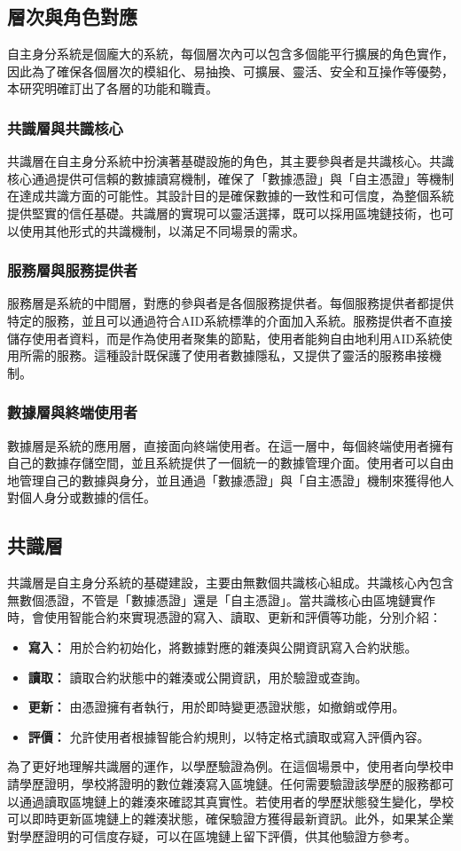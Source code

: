 \subsection{層次與角色對應}
自主身分系統是個龐大的系統，每個層次內可以包含多個能平行擴展的角色實作，因此為了確保各個層次的模組化、易抽換、可擴展、靈活、安全和互操作等優勢，本研究明確訂出了各層的功能和職責。
\subsubsection{共識層與共識核心}
共識層在自主身分系統中扮演著基礎設施的角色，其主要參與者是共識核心。共識核心通過提供可信賴的數據讀寫機制，確保了「數據憑證」與「自主憑證」等機制在達成共識方面的可能性。其設計目的是確保數據的一致性和可信度，為整個系統提供堅實的信任基礎。共識層的實現可以靈活選擇，既可以採用區塊鏈技術，也可以使用其他形式的共識機制，以滿足不同場景的需求。
\subsubsection{服務層與服務提供者}
服務層是系統的中間層，對應的參與者是各個服務提供者。每個服務提供者都提供特定的服務，並且可以通過符合AID系統標準的介面加入系統。服務提供者不直接儲存使用者資料，而是作為使用者聚集的節點，使用者能夠自由地利用AID系統使用所需的服務。這種設計既保護了使用者數據隱私，又提供了靈活的服務串接機制。
\subsubsection{數據層與終端使用者}
數據層是系統的應用層，直接面向終端使用者。在這一層中，每個終端使用者擁有自己的數據存儲空間，並且系統提供了一個統一的數據管理介面。使用者可以自由地管理自己的數據與身分，並且通過「數據憑證」與「自主憑證」機制來獲得他人對個人身分或數據的信任。
\subsection{共識層}
共識層是自主身分系統的基礎建設，主要由無數個共識核心組成。共識核心內包含無數個憑證，不管是「數據憑證」還是「自主憑證」。當共識核心由區塊鏈實作時，會使用智能合約來實現憑證的寫入、讀取、更新和評價等功能，分別介紹：
\begin{itemize}
  \item \textbf{寫入：} 用於合約初始化，將數據對應的雜湊與公開資訊寫入合約狀態。
  \item \textbf{讀取：} 讀取合約狀態中的雜湊或公開資訊，用於驗證或查詢。
  \item \textbf{更新：} 由憑證擁有者執行，用於即時變更憑證狀態，如撤銷或停用。
  \item \textbf{評價：} 允許使用者根據智能合約規則，以特定格式讀取或寫入評價內容。
\end{itemize}
為了更好地理解共識層的運作，以學歷驗證為例。在這個場景中，使用者向學校申請學歷證明，學校將證明的數位雜湊寫入區塊鏈。任何需要驗證該學歷的服務都可以通過讀取區塊鏈上的雜湊來確認其真實性。若使用者的學歷狀態發生變化，學校可以即時更新區塊鏈上的雜湊狀態，確保驗證方獲得最新資訊。此外，如果某企業對學歷證明的可信度存疑，可以在區塊鏈上留下評價，供其他驗證方參考。

